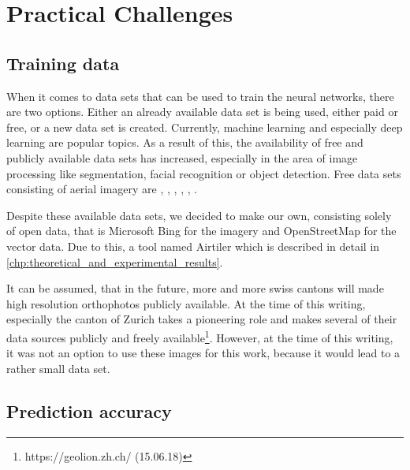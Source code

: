 
\chapter{Practical Challenges}\label{chp:practical_challenges}

\section{Training data}
When it comes to data sets that can be used to train the neural networks, there are two options. Either an already available data set is being used, either paid or free, or a new data set is created. Currently, machine learning and especially deep learning are popular topics. As a result of this, the availability of free and publicly available data sets has increased, especially in the area of image processing like segmentation, facial recognition or object detection. Free data sets consisting of aerial imagery are  \cite{VolodymyrMnih.2013}, \cite{spacenet}, \cite{isprs-vaihingen}, \cite{isprs-potsdam}, \cite{Helber.20170831}, \cite{deepsat}.

Despite these available data sets, we decided to make our own, consisting solely of open data, that is Microsoft Bing for the imagery and OpenStreetMap for the vector data. Due to this, a tool named Airtiler \cite{airtiler} which is described in detail in \autoref{chp:theoretical_and_experimental_results}.

It can be assumed, that in the future, more and more swiss cantons will made high resolution orthophotos publicly available. At the time of this writing, especially the canton of Zurich takes a pioneering role and makes several of their data sources publicly and freely available\footnote{https://geolion.zh.ch/ (15.06.18)}. However, at the time of this writing, it was not an option to use these images for this work, because it would lead to a rather small data set.

\section{Prediction accuracy}
